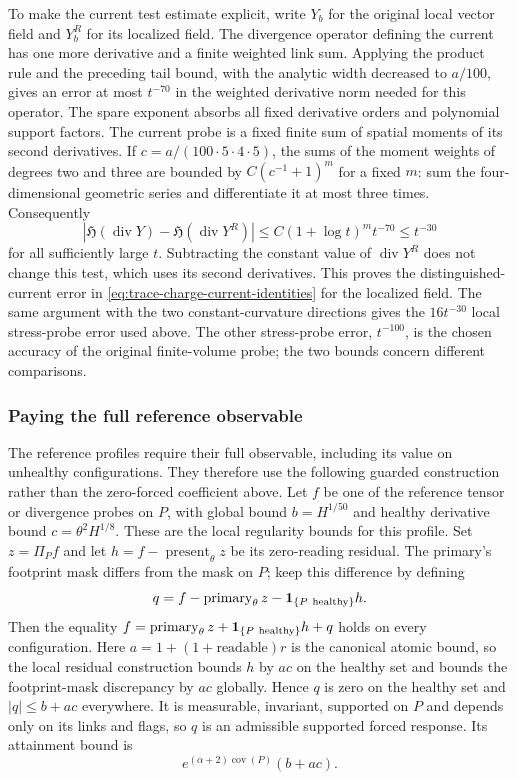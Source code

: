 To make the current test estimate explicit, write $Y_b$ for the original
local vector field and $Y_b^R$ for its localized field. The divergence
operator defining the current has one more derivative and a finite
weighted link sum. Applying the product rule and the preceding tail
bound, with the analytic width decreased to $a/100$, gives an error at
most $t^{-70}$ in the weighted derivative norm needed for this operator.
The spare exponent absorbs all fixed derivative orders and polynomial
support factors. The current probe is a fixed finite sum of spatial
moments of its second derivatives. If $c=a/(100\cdot5\cdot4\cdot5)$,
the sums of the moment weights of degrees two and three are bounded by
$C(c^{-1}+1)^m$ for a fixed $m$: sum the four-dimensional geometric
series and differentiate it at most three times. Consequently
\[
 |\mathfrak H(\operatorname{div}Y)
      -\mathfrak H(\operatorname{div}Y^R)|
 \le C(1+\log t)^m t^{-70}\le t^{-30}
\]
for all sufficiently large $t$. Subtracting the constant value of
$\operatorname{div}Y^R$ does not change this test, which uses its second
derivatives. This proves the distinguished-current error in
\eqref{eq:trace-charge-current-identities} for the localized field.
The same argument with the two constant-curvature directions gives the
$16t^{-30}$ local stress-probe error used above. The other stress-probe
error, $t^{-100}$, is the chosen accuracy of the original finite-volume
probe; the two bounds concern different comparisons.

\subsubsection{Paying the full reference observable}
\label{subsec:trace-reference-atomic-certificate}

The reference profiles require their full observable, including its value
on unhealthy configurations. They therefore use the following guarded
construction rather than the zero-forced coefficient above. Let $f$ be one
of the reference tensor or divergence probes on $P$, with global bound
$b=H^{1/50}$ and healthy derivative bound $c=\theta^2H^{1/8}$. These are
the local regularity bounds for this profile. Set $z=\Pi_P f$ and let
$h=f-\operatorname{present}_\theta z$ be its zero-reading residual.
The primary's footprint mask differs from the mask on $P$; keep this
difference by defining
\[
 q=f-\operatorname{primary}_\theta z
                       -{\bf1}_{\{P\ \mathrm{healthy}\}}h.
\]
Then the equality $f=\operatorname{primary}_\theta z+
{\bf1}_{\{P\ \mathrm{healthy}\}}h+q$ holds on every configuration.
Here $a=1+(1+\mathrm{readable})r$ is the canonical atomic bound,
so the local residual construction bounds $h$ by $ac$ on the healthy set
and bounds the footprint-mask discrepancy by $ac$ globally. Hence
$q$ is zero on the healthy set and $|q|\le b+ac$ everywhere. It is
measurable, invariant, supported on $P$ and depends only on its links and
flags, so $q$ is an admissible supported forced response. Its attainment
bound is
\[
 e^{(\alpha+2)\operatorname{cov}(P)}(b+ac).
\]

